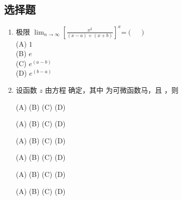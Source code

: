 
\subsection{选择题}
\begin{enumerate}
\item 极限  $\displaystyle \lim_{n\to\infty}[\frac{x^2}{(x-a)+(x+b)}]^x$=$(\quad )$\\
(A) $1$\\
(B) $e$\\
(C) $e^(a-b)$\\
(D) $e^(b-a)$
\item  设函数 $z$ 由方程  确定，其中  为可微函数马，且  ，则  



(A) 
(B)
(C)
(D)


(A) 
(B)
(C)
(D)

(A) 
(B)
(C)
(D)

(A) 
(B)
(C)
(D)

(A) 
(B)
(C)
(D)


(A) 
(B)
(C)
(D)

\end{enumerate}